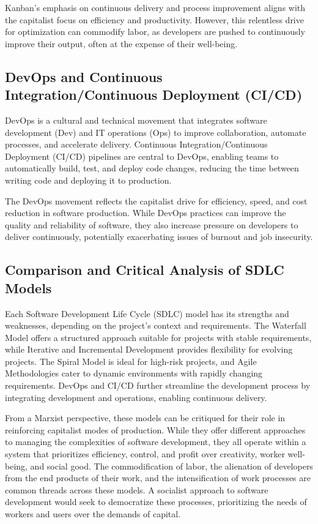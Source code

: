 \begin{refsection}
\begin{multicols}{2}
{Kanban’s emphasis on continuous delivery and process improvement aligns with the capitalist focus on efficiency and productivity. However, this relentless drive for optimization can commodify labor, as developers are pushed to continuously improve their output, often at the expense of their well-being.

\subsection{DevOps and Continuous Integration/Continuous Deployment (CI/CD)}

DevOps is a cultural and technical movement that integrates software development (Dev) and IT operations (Ops) to improve collaboration, automate processes, and accelerate delivery. Continuous Integration/Continuous Deployment (CI/CD) pipelines are central to DevOps, enabling teams to automatically build, test, and deploy code changes, reducing the time between writing code and deploying it to production.

The DevOps movement reflects the capitalist drive for efficiency, speed, and cost reduction in software production. While DevOps practices can improve the quality and reliability of software, they also increase pressure on developers to deliver continuously, potentially exacerbating issues of burnout and job insecurity.

\subsection{Comparison and Critical Analysis of SDLC Models}

Each Software Development Life Cycle (SDLC) model has its strengths and weaknesses, depending on the project's context and requirements. The Waterfall Model offers a structured approach suitable for projects with stable requirements, while Iterative and Incremental Development provides flexibility for evolving projects. The Spiral Model is ideal for high-risk projects, and Agile Methodologies cater to dynamic environments with rapidly changing requirements. DevOps and CI/CD further streamline the development process by integrating development and operations, enabling continuous delivery.

From a Marxist perspective, these models can be critiqued for their role in reinforcing capitalist modes of production. While they offer different approaches to managing the complexities of software development, they all operate within a system that prioritizes efficiency, control, and profit over creativity, worker well-being, and social good. The commodification of labor, the alienation of developers from the end products of their work, and the intensification of work processes are common threads across these models. A socialist approach to software development would seek to democratize these processes, prioritizing the needs of workers and users over the demands of capital.

}
\end{multicols}
\end{refsection}
